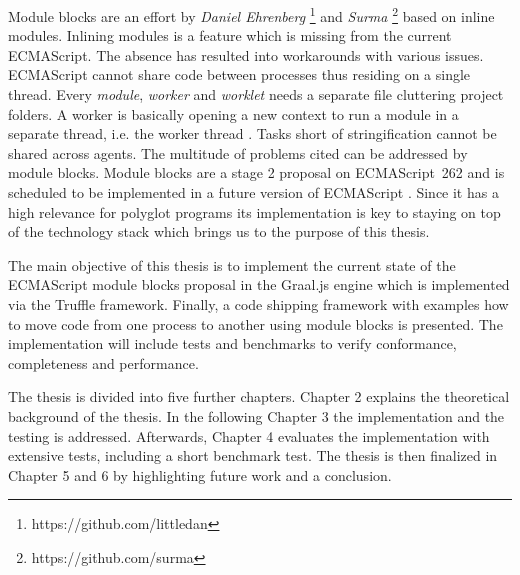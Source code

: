 Module blocks are an effort by \emph{Daniel Ehrenberg} \footnote{https://github.com/littledan} and \emph{Surma} \footnote{https://github.com/surma} based on inline modules. Inlining modules is a feature which is missing from the current ECMAScript. The absence has resulted into workarounds with various issues. ECMAScript cannot share code between processes thus residing on a single thread. Every \emph{module}, \emph{worker} and \emph{worklet} needs a separate file cluttering project folders. A worker is basically opening a new context to run a module in a separate thread, i.e. the worker thread \cite{workers}. Tasks short of stringification cannot be shared across agents. The multitude of problems cited can be addressed by module blocks. Module blocks are a stage 2 proposal on ECMAScript~262 and is scheduled to be implemented in a future version of ECMAScript \cite{gitMB}. Since it has a high relevance for polyglot programs its implementation is key to staying on top of the technology stack which brings us to the purpose of this thesis.

The main objective of this thesis is to implement the current state of the ECMAScript module blocks proposal in the Graal.js engine which is implemented via the Truffle framework. Finally, a code shipping framework with examples how to move code from one process to another using module blocks is presented. The implementation will include tests and benchmarks to verify conformance, completeness and performance.

The thesis is divided into five further chapters. Chapter 2 explains the theoretical background of the thesis. In the following Chapter 3 the implementation and the testing is addressed. Afterwards, Chapter 4 evaluates the implementation with extensive tests, including a short benchmark test. The thesis is then finalized in Chapter 5 and 6 by highlighting future work and a conclusion.



